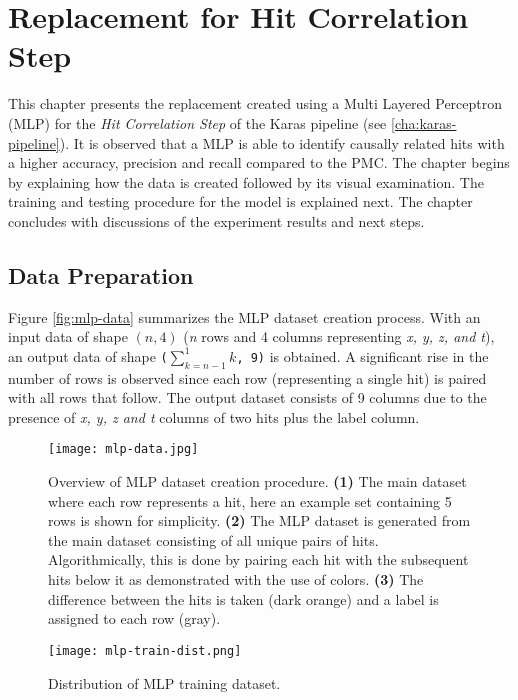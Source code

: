 
\chapter{Replacement for Hit Correlation Step} %
\label{cha:mlp}

% 
This chapter presents the replacement created using a Multi Layered
Perceptron (MLP) for the \textit{Hit Correlation Step} of the Karas
pipeline (see \ref{cha:karas-pipeline}). It is observed that a MLP is
able to identify causally related hits with a higher accuracy,
precision and recall compared to the PMC. The chapter begins by
explaining how the data is created followed by its visual examination.
The training and testing procedure for the model is explained next.
The chapter concludes with discussions of the experiment results and
next steps.

\section{Data Preparation}
\label{sec:mlp-data-prep}

Figure \ref{fig:mlp-data} summarizes the MLP dataset creation process.
With an input data of shape $(n, 4)$ (\emph{n} rows and 4 columns
representing \emph{x, y, z, and t}), an output data of shape
\texttt{($\sum_{k=n-1}^{1}k$, 9)} is obtained. A significant rise in
the number of rows is observed since each row (representing a single
hit) is paired with all rows that follow. The output dataset consists
of 9 columns due to the presence of \emph{x, y, z and t} columns of
two hits plus the label column.

\begin{figure}[htb]
  \centering
  \begin{minipage}[t]{0.74\textwidth}
    \texttt{[image: mlp-data.jpg]}
    \caption{Overview of MLP dataset creation procedure. \textbf{(1)}
      The main dataset where each row represents a hit, here an example
      set containing 5 rows is shown for simplicity. \textbf{(2)} The
      MLP dataset is generated from the main dataset consisting of all
      unique pairs of hits. Algorithmically, this is done by pairing
      each hit with the subsequent hits below it as demonstrated with
      the use of colors. \textbf{(3)} The difference between the hits is
      taken (dark orange) and a label is assigned to each row (gray).}
    \label{fig:mlp-data}
  \end{minipage}
  \begin{minipage}[t]{0.24\textwidth}
    \centering
    \texttt{[image: mlp-train-dist.png]}
    \caption{Distribution of MLP training dataset.}
    \label{fig:mlp-train-dist}
  \end{minipage}
\end{figure}

